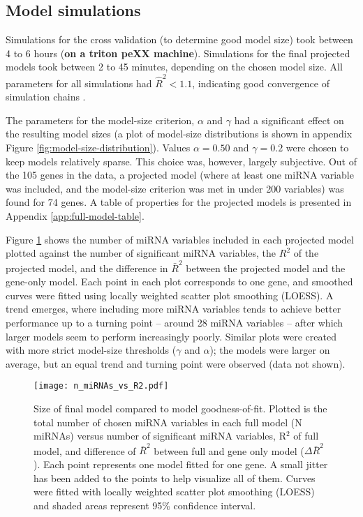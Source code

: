\subsection{Model simulations}

Simulations for the cross validation (to determine good model size) took
between 4 to 6 hours (\textbf{on a triton peXX machine}). Simulations for the
final projected models took between 2 to 45 minutes, depending on the chosen
model size. All parameters for all simulations had $\hat{R}^2 < 1.1$,
indicating good convergence of simulation chains \citep{Gelman2013}.

The parameters for the model-size criterion, $\alpha$ and $\gamma$ had a
significant effect on the resulting model sizes (a plot of model-size
distributions is shown in appendix Figure \ref{fig:model-size-distribution}).
Values $\alpha = 0.50$ and $\gamma = 0.2$ were chosen to keep models
relatively sparse. This choice was, however, largely subjective. Out of the
105 genes in the data, a projected model (where at least one miRNA variable
was included, and the model-size criterion was met in under 200 variables) was
found for 74 genes. A table of properties for the projected models is
presented in Appendix
\ref{app:full-model-table}.

Figure \ref{n-miRNAs-vs-R2} shows the number of miRNA variables included in
each projected model plotted against the number of significant miRNA
variables, the $R^2$ of the projected model, and the difference in $\bar{R}^2$
between the projected model and the gene-only model. Each point in each plot
corresponds to one gene, and smoothed curves were fitted using locally
weighted scatter plot smoothing (LOESS). A trend emerges, where including more
miRNA variables tends to achieve better performance up to a turning point --
around 28 miRNA variables -- after which larger models seem to perform
increasingly poorly. Similar plots were created with more strict model-size
thresholds ($\gamma$ and $\alpha$); the models were larger on
average, but an equal trend and turning point were observed (data not shown).

\begin{figure}[!h]
  \centering
  \texttt{[image: n\_miRNAs\_vs\_R2.pdf]}
  \caption{Size of final model compared to model goodness-of-fit. Plotted is
  the total number of chosen miRNA variables in each full model (N miRNAs)
  versus number of significant miRNA variables, R$^2$ of full model, and
  difference of $\bar{R}^2$ between full and gene only model
  ($\Delta\bar{R}^2$). Each point represents one model fitted for one gene. A
  small jitter has been added to the points to help visualize all of them.
  Curves were fitted with locally weighted scatter plot smoothing (LOESS) and
  shaded areas represent 95\% confidence interval.}
  \label{n-miRNAs-vs-R2}
\end{figure}


